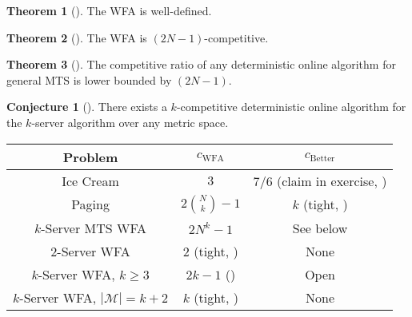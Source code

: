 \documentclass[10pt]{amsart}
\theoremstyle{definition}
\newtheorem{theorem}{Theorem}
\newtheorem{conjecture}{Conjecture}
\theoremstyle{remark}
\begin{document}
    \begin{theorem}[{\cite[pp. 132-133]{Borodin}}]
        The WFA is well-defined.
    \end{theorem}

    \begin{theorem}[{\cite[pp. 133-134]{Borodin}}] \label{wfa_competitiveness_theorem}
        The WFA is \((2N-1)\)-competitive.
    \end{theorem}
    
    \begin{theorem}[{\cite[pp. 128-132]{Borodin}}]
        The competitive ratio of any deterministic online algorithm for general MTS is lower bounded by \((2N-1)\).
    \end{theorem}

    \begin{conjecture}[{\cite[pp. 152-153]{Borodin}}]
        There exists a \(k\)-competitive deterministic online algorithm for the \(k\)-server algorithm over any metric space.
    \end{conjecture}

    \begin{table}[!hbtp]
        \begin{tabular}{c|c|c}
            Problem & \(c_{\text{WFA}}\) & \(c_{\text{Better}}\)\\\hline
            Ice Cream & \(3\) & \(7/6\) (claim in exercise, \cite[pp. 80-82]{Woeginger}) \\
            Paging & \(2\binom{N}{k}-1\) & \(k\) (tight, \cite[pp. 54-56]{Woeginger})\\
            \(k\)-Server MTS WFA & \(2N^k-1\) & See below\\
            \(2\)-Server WFA & \(2\) (tight, \cite[pp. 87-89, p. 94]{Woeginger}) & None\\
            \(k\)-Server WFA, \(k \geq 3\) & \(2k-1\) (\cite[pp. 92-93]{Woeginger}) & Open\\
            \(k\)-Server WFA, \(|\mathcal{M}| = k+2\) & \(k\) (tight, \cite[pp. 87-89, pp. 94-95]{Woeginger}) & None
        \end{tabular}
    \end{table}

    \printbibliography{}
\end{document}
